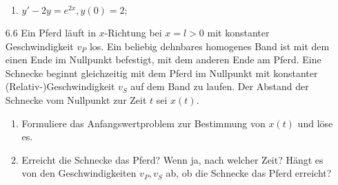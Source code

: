 \documentclass{HM}
\begin{document}
\begin{enumerate}
\begin{enumerate}
			\item $y' - 2y = e^{2x}, y(0)=2;$
			\begin{eqnn}
				\eqnspace
			\end{eqnn}
		\end{enumerate}
		
		\item [6.6]  Ein Pferd läuft in $x$-Richtung bei $x=l>0$ mit konstanter Geschwindigkeit $v_P$ los. Ein beliebig dehnbares homogenes Band ist mit dem einen Ende im Nullpunkt befestigt, mit dem anderen Ende am Pferd. Eine Schnecke beginnt gleichzeitig mit dem Pferd im Nullpunkt mit konstanter (Relativ-)Geschwindigkeit $v_S$ auf dem Band zu laufen. Der Abstand der Schnecke vom Nullpunkt zur Zeit $t$ sei $x(t)$.
		\begin{enumerate}
			\item Formuliere das Anfangswertproblem zur Bestimmung von $x(t)$ und löse es.
			\item Erreicht die Schnecke das Pferd? Wenn ja, nach welcher Zeit? Hängt es von den Geschwindigkeiten $v_P, v_S$ ab, ob die Schnecke das Pferd erreicht?
		\end{enumerate}
	\end{enumerate}
\end{document}
